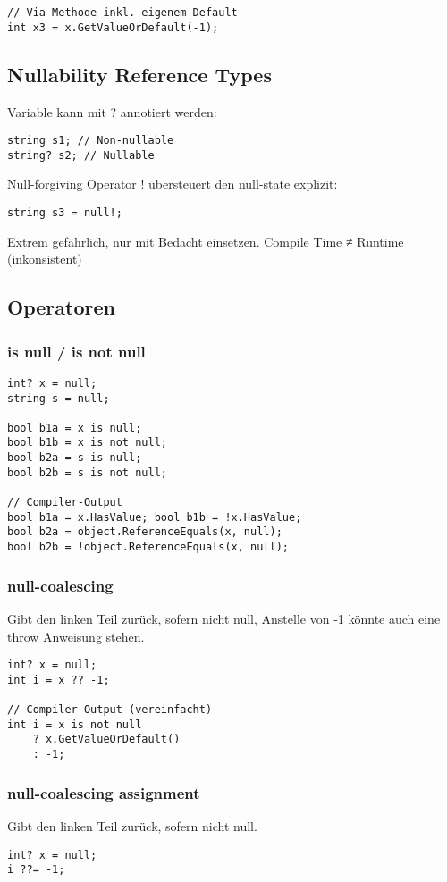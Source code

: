 \begin{multicols*}{2}
\begin{lstlisting}
// Via Methode inkl. eigenem Default
int x3 = x.GetValueOrDefault(-1);
\end{lstlisting}

\subsection{Nullability Reference Types}
Variable kann mit ? annotiert werden: 
\begin{lstlisting}
string s1; // Non-nullable
string? s2; // Nullable
\end{lstlisting}
Null-forgiving Operator ! übersteuert den null-state explizit:
\begin{lstlisting}
string s3 = null!;
\end{lstlisting}
Extrem gefährlich, nur mit Bedacht einsetzen. Compile Time ≠ Runtime (inkonsistent)

\subsection{Operatoren}
\subsubsection{is null / is not null}
\begin{lstlisting}
int? x = null; 
string s = null;

bool b1a = x is null;
bool b1b = x is not null;
bool b2a = s is null;
bool b2b = s is not null;

// Compiler-Output
bool b1a = x.HasValue; bool b1b = !x.HasValue;
bool b2a = object.ReferenceEquals(x, null);
bool b2b = !object.ReferenceEquals(x, null);
\end{lstlisting}
\subsubsection{null-coalescing}
Gibt den linken Teil zurück, sofern nicht null, Anstelle von -1 könnte auch eine throw Anweisung stehen.
\begin{lstlisting}
int? x = null;
int i = x ?? -1;

// Compiler-Output (vereinfacht)
int i = x is not null
    ? x.GetValueOrDefault()
    : -1;  
\end{lstlisting}
\subsubsection{null-coalescing assignment}
Gibt den linken Teil zurück, sofern nicht null.
\begin{lstlisting}
int? x = null;
i ??= -1;


\end{lstlisting}
\end{multicols*}
